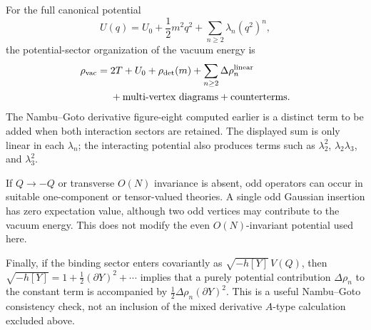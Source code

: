 For the full canonical potential
\begin{equation}
  U(q)=U_0+\frac12m^2q^2+\sum_{n\geq2}\lambda_n(q^2)^n,
\end{equation}
the potential-sector organization of the vacuum energy is
\begin{align}
  \rho_{\mathrm{vac}}
  ={}&2T+U_0+\rho_{\mathrm{det}}(m)
  +\sum_{n\geq2}\Delta\rho_n^{\mathrm{linear}}
  \notag\\
  &+\text{multi-vertex diagrams}+\text{counterterms}.
  \label{eq:full-binding-potential-vacuum-organization}
\end{align}
The Nambu--Goto derivative figure-eight computed earlier is a distinct term to
be added when both interaction sectors are retained.  The displayed sum is
only linear in each $\lambda_n$; the interacting potential also produces
terms such as $\lambda_2^2$, $\lambda_2\lambda_3$, and $\lambda_3^2$.

If $Q\to-Q$ or transverse $O(N)$ invariance is absent, odd operators can occur
in suitable one-component or tensor-valued theories.  A single odd Gaussian
insertion has zero expectation value, although two odd vertices may contribute
to the vacuum energy.  This does not modify the even $O(N)$-invariant potential
used here.

Finally, if the binding sector enters covariantly as
$\sqrt{-h[Y]}\,V(Q)$, then
$\sqrt{-h[Y]}=1+\tfrac12(\partial Y)^2+\cdots$ implies that a purely potential
contribution $\Delta\rho_n$ to the constant term is accompanied by
$\tfrac12\Delta\rho_n(\partial Y)^2$.  This is a useful Nambu--Goto
consistency check, not an inclusion of the mixed derivative $A$-type
calculation excluded above.
